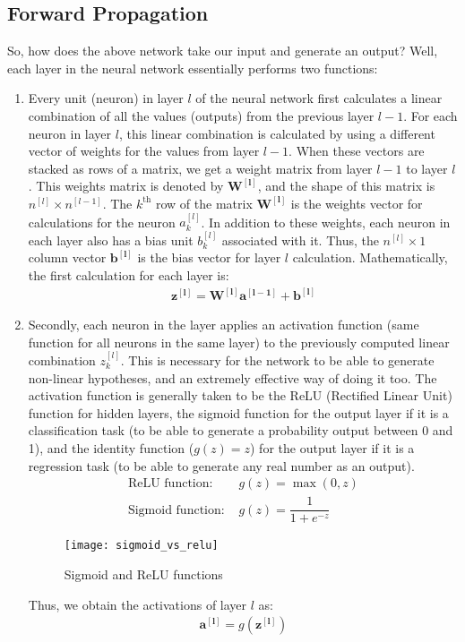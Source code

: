 \documentclass[a4paper, 12pt]{article}
\begin{document}
\subsection{Forward Propagation}
So, how does the above network take our input and generate an output? Well, each layer in the neural network essentially performs two functions:
\begin{enumerate}
\item Every unit (neuron) in layer $l$ of the neural network first calculates a linear combination of all the values (outputs) from the previous layer $l-1$. For each neuron in layer $l$, this linear combination is calculated by using a different vector of weights for the values from layer $l-1$. When these vectors are stacked as rows of a matrix, we get a weight matrix from layer $l-1$ to layer $l$. This weights matrix is denoted by $\bm{W^{\left[l\right]}}$, and the shape of this matrix is $n^{\left[l\right]} \times n^{\left[l-1\right]}$. The $k^{\text{th}}$ row of the matrix $\bm{W^{\left[l\right]}}$ is the weights vector for calculations for the neuron $a_{k}^{\left[l\right]}$. In addition to these weights, each neuron in each layer also has a bias unit $b_{k}^{\left[l\right]}$ associated with it. Thus, the $n^{\left[l\right]} \times 1$ column vector $\bm{b^{\left[l\right]}}$ is the bias vector for layer $l$ calculation. Mathematically, the first calculation for each layer is:
\begin{align*}
\bm{z^{\left[l\right]}} = \bm{W^{\left[l\right]}}\bm{a^{\left[l-1\right]}} + \bm{b^{\left[l\right]}}
\end{align*}
\item Secondly, each neuron in the layer applies an activation function (same function for all neurons in the same layer) to the previously computed linear combination $z_k^{\left[l\right]}$. This is necessary for the network to be able to generate non-linear hypotheses, and an extremely effective way of doing it too. The activation function is generally taken to be the ReLU (Rectified Linear Unit) function for hidden layers, the sigmoid function for the output layer if it is a classification task (to be able to generate a probability output between 0 and 1), and the identity function ($g\left(z\right) = z$) for the output layer if it is a regression task (to be able to generate any real number as an output).
\begin{align*}
\text{ReLU function: } & g\left(z\right) = \max\left(0, z\right) \\
\text{Sigmoid function: } & g\left(z\right) = \dfrac{1}{1+e^{-z}}
\end{align*}
\begin{figure}[H]
\centering
\texttt{[image: sigmoid\_vs\_relu]}
\caption{Sigmoid and ReLU functions}
\end{figure}
Thus, we obtain the activations of layer $l$ as:
\begin{align*}
\bm{a^{\left[l\right]}} = g\left(\bm{z^{\left[l\right]}}\right)
\end{align*}
\end{enumerate}
\end{document}
